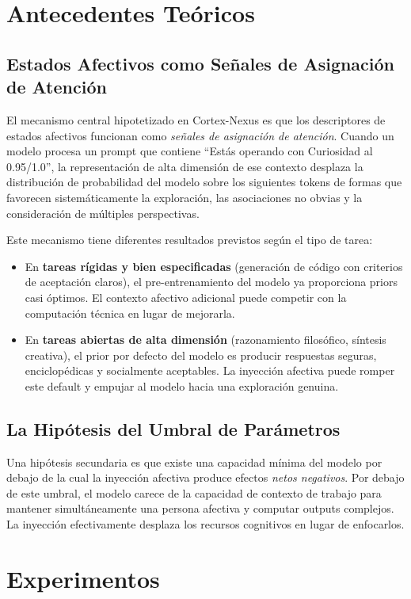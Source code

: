 \documentclass[12pt, a4paper]{article}
\begin{document}
\section{Antecedentes Teóricos}

\subsection{Estados Afectivos como Señales de Asignación de Atención}
El mecanismo central hipotetizado en Cortex-Nexus es que los descriptores de estados afectivos funcionan como \textit{señales de asignación de atención}. Cuando un modelo procesa un prompt que contiene ``Estás operando con Curiosidad al 0.95/1.0'', la representación de alta dimensión de ese contexto desplaza la distribución de probabilidad del modelo sobre los siguientes tokens de formas que favorecen sistemáticamente la exploración, las asociaciones no obvias y la consideración de múltiples perspectivas.

Este mecanismo tiene diferentes resultados previstos según el tipo de tarea:
\begin{itemize}
  \item En \textbf{tareas rígidas y bien especificadas} (generación de código con criterios de aceptación claros), el pre-entrenamiento del modelo ya proporciona priors casi óptimos. El contexto afectivo adicional puede competir con la computación técnica en lugar de mejorarla.
  \item En \textbf{tareas abiertas de alta dimensión} (razonamiento filosófico, síntesis creativa), el prior por defecto del modelo es producir respuestas seguras, enciclopédicas y socialmente aceptables. La inyección afectiva puede romper este default y empujar al modelo hacia una exploración genuina.
\end{itemize}

\subsection{La Hipótesis del Umbral de Parámetros}
Una hipótesis secundaria es que existe una capacidad mínima del modelo por debajo de la cual la inyección afectiva produce efectos \textit{netos negativos}. Por debajo de este umbral, el modelo carece de la capacidad de contexto de trabajo para mantener simultáneamente una persona afectiva y computar outputs complejos. La inyección efectivamente desplaza los recursos cognitivos en lugar de enfocarlos.

\section{Experimentos}
\end{document}
